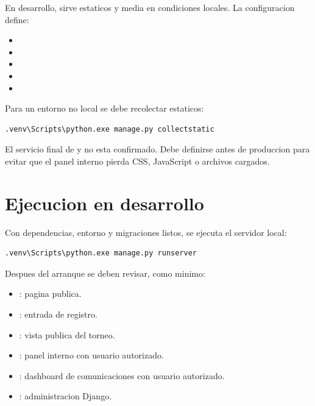 En desarrollo,  sirve estaticos y media en condiciones locales. La configuracion define:

\begin{itemize}
  \item {}
  \item {}
  \item {}
  \item {}
  \item {}
\end{itemize}

Para un entorno no local se debe recolectar estaticos:

\begin{lstlisting}[language=bash,caption={Recoleccion de archivos estaticos},label={lst:instalacion-collectstatic}]
.venv\Scripts\python.exe manage.py collectstatic
\end{lstlisting}

\begin{advertencia}
El servicio final de  y  no esta confirmado. Debe definirse antes de produccion para evitar que el panel interno pierda CSS, JavaScript o archivos cargados.
\end{advertencia}

\section{Ejecucion en desarrollo}
\label{sec:instalacion-runserver}

Con dependencias, entorno y migraciones listos, se ejecuta el servidor local:

\begin{lstlisting}[language=bash,caption={Ejecucion del servidor local},label={lst:instalacion-runserver}]
.venv\Scripts\python.exe manage.py runserver
\end{lstlisting}

Despues del arranque se deben revisar, como minimo:

\begin{itemize}
  \item \ruta{/}: pagina publica.
  \item {}: entrada de registro.
  \item {}: vista publica del torneo.
  \item {}: panel interno con usuario autorizado.
  \item {}: dashboard de comunicaciones con usuario autorizado.
  \item {}: administracion Django.
\end{itemize}

